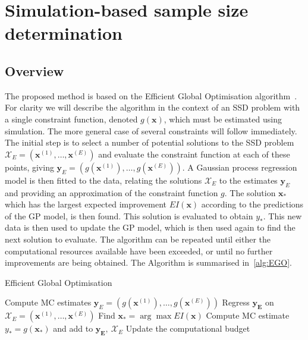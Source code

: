 \documentclass[]{sagej}
\begin{document}
\section{Simulation-based sample size determination}\label{sec:methods}

\subsection{Overview}

The proposed method is based on the Efficient Global Optimisation algorithm~\cite{Jones1998}. For clarity we will describe the algorithm in the context of an SSD problem with a single constraint function, denoted $g(\mathbf{x})$, which must be estimated using simulation. The more general case of several constraints will follow immediately. The initial step is to select a number of potential solutions to the SSD problem $\mathcal{X}_{E} = (\mathbf{x}^{(1)}, \ldots , \mathbf{x}^{(E)})$ and evaluate the constraint function at each of these points, giving $\mathbf{y}_{E} = (g(\mathbf{x}^{(1)}), \ldots , g(\mathbf{x}^{(E)}))$. A Gaussian process regression model is then fitted to the data, relating the solutions $\mathcal{X}_{E}$ to the estimates $\mathbf{y}_{E}$ and providing an approximation of the constraint function $g$. The solution $\mathbf{x}_{*}$ which has the largest expected improvement $EI(\mathbf{x})$ according to the predictions of the GP model, is then found. This solution is evaluated to obtain $y_*$. This new data is then used to update the GP model, which is then used again to find the next solution to evaluate. The algorithm can be repeated until either the computational resources available have been exceeded, or until no further improvements are being obtained. The Algorithm is summarised in~\ref{alg:EGO}.

\begin{algorithm}
\caption{Efficient Global Optimisation~\cite{Jones1998}}\label{alg:EGO}
\begin{algorithmic}[1]
\State Compute MC estimates $\mathbf{y}_{E} = (g(\mathbf{x}^{(1)}), \ldots , g(\mathbf{x}^{(E)}))$
\State Regress $\mathbf{y_{E}}$ on $\mathcal{X}_{E} = (\mathbf{x}^{(1)}, \ldots , \mathbf{x}^{(E)})$
\State Find $\mathbf{x}_{*} = \arg\max EI(\mathbf{x})$
\State Compute MC estimate $y_{*} = g(\mathbf{x}_{*})$ and add to $\mathbf{y_{E}},~\mathcal{X}_{E}$
\State Update the computational budget
\EndWhile
\end{algorithmic}
\end{algorithm}
\end{document}
